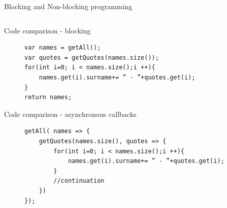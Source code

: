 \documentclass{beamer}
\begin{document}
\begin{frame}{Blocking and Non-blocking programming}
\begin{columns}
\begin{column}{0.5\textwidth}
        \end{column}
    \end{columns}
\end{frame}
\begin{frame}[fragile]{Code comparison - blocking}
    \begin{figure}
        \begin{lstlisting}
var names = getAll();
var quotes = getQuotes(names.size());
for(int i=0; i < names.size();i ++){
    names.get(i).surname+= ” - ”+quotes.get(i);
}
return names;
        \end{lstlisting}
    \end{figure}
\end{frame}
\begin{frame}[fragile]{Code comparison - asynchronous callbacks}
    \begin{figure}
        \begin{lstlisting}
getAll( names => {
    getQuotes(names.size(), quotes => {
        for(int i=0; i < names.size();i ++){
            names.get(i).surname+= ” - ”+quotes.get(i);
        }
        //continuation
    })
});
        \end{lstlisting}
    \end{figure}
\end{frame}
\end{document}
